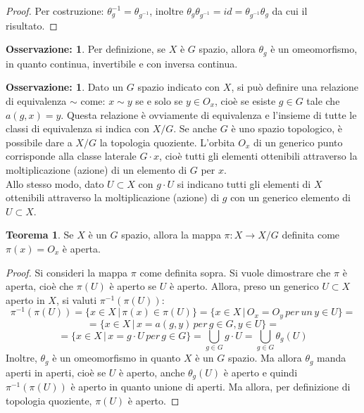 \documentclass[12pt,a4paper]{report}
\theoremstyle{definition}
\newtheorem{Theo}[Def]{Teorema}
\theoremstyle{definition}
\theoremstyle{definition}
\theoremstyle{definition}
\newtheorem{Obs}[Def]{Osservazione:}
\begin{document}
\begin{proof}
	Per costruzione: $\theta_g^{-1}=\theta_{g^{-1}}$, inoltre $\theta_g\theta_{g^{-1}}=id=\theta_{g^{-1}}\theta_g$ da cui il risultato.
\end{proof}
\begin{Obs}
	Per definizione, se $X$ è $G$ spazio, allora $\theta_g$ è un omeomorfismo, in quanto continua, invertibile e con inversa continua.
\end{Obs}
\begin{Obs}
	Dato un $G$ spazio indicato con $X$, si può definire una relazione di equivalenza $\sim$ come: $x\sim y$ se e solo se $y\in O_x$, cioè se esiste $g\in G$ tale che $a(g,x)=y$. Questa relazione è ovviamente di equivalenza e l'insieme di tutte le classi di equivalenza si indica con $X/G$. Se anche $G$ è uno spazio topologico, è possibile dare a $X/G$ la topologia quoziente. 
	L'orbita $O_x$ di un generico punto corrisponde alla classe laterale $G\cdot x$, cioè tutti gli elementi ottenibili attraverso la moltiplicazione (azione) di un elemento di $G$ per $x$. \\
	Allo stesso modo, dato $U\subset X$ con $g\cdot U$ si indicano tutti gli elementi di $X$ ottenibili attraverso la moltiplicazione (azione) di $g$ con un generico elemento di $U\subset X$. 
\end{Obs}
\begin{Theo}
	Se $X$ è un $G$ spazio, allora la mappa $\pi:X\rightarrow X/G$ definita come $\pi(x)=O_x$ è aperta.
\end{Theo}
\begin{proof}
	Si consideri la mappa $\pi$ come definita sopra. Si vuole dimostrare che $\pi$ è aperta, cioè che $\pi(U)$ è aperto se $U$ è aperto. Allora, preso un generico $U\subset X$ aperto in $X$, si valuti $\pi^{-1}(\pi(U))$:
	$$\pi^{-1}(\pi(U))=\{x\in X \,|\, \pi(x)\in \pi(U)\}=\{x\in X \,|\, O_x=O_y \, per \, un \, y\in U\}=$$
	$$=\{x\in X \, | \, x=a(g,y) \, per \, g\in G, y\in U\}=$$
	$$=\{x\in X \, | \, x=g\cdot U \, per \, g\in G\}= \bigcup_{g\in G} g\cdot U=\bigcup_{g\in G}\theta_g(U)$$
	Inoltre, $\theta_g$ è un omeomorfismo in quanto $X$ è un $G$ spazio. Ma allora $\theta_g$ manda aperti in aperti, cioè se $U$ è aperto, anche $\theta_g(U)$ è aperto e quindi $\pi^{-1}(\pi(U))$ è aperto in quanto unione di aperti. Ma allora, per definizione di topologia quoziente, $\pi(U)$ è aperto.
\end{proof}
\end{document}
